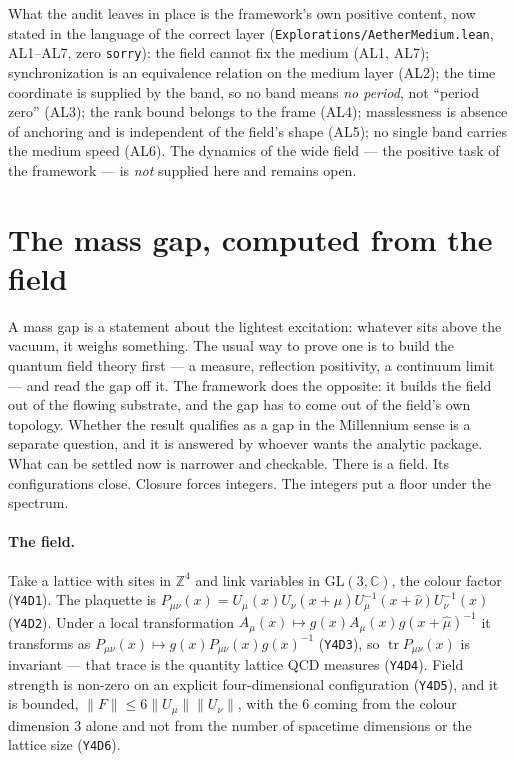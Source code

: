 \documentclass[aps,prd,preprint,superscriptaddress,amsmath,amssymb]{revtex4-2}
\begin{document}
What the audit leaves in place is the framework's own positive content, now
stated in the language of the correct layer (\texttt{Explorations/AetherMedium.lean}, AL1--AL7, zero \texttt{sorry}):
the field cannot fix the medium (AL1, AL7); synchronization is an equivalence
relation on the medium layer (AL2); the time coordinate is supplied by the band,
so no band means \emph{no period}, not ``period zero'' (AL3); the rank bound
belongs to the frame (AL4); masslessness is absence of anchoring and is
independent of the field's shape (AL5); no single band carries the medium speed
(AL6).  The dynamics of the wide field --- the positive task of the framework ---
is \emph{not} supplied here and remains open.

\section{The mass gap, computed from the field}
\label{sec:ymstatus}

A mass gap is a statement about the lightest excitation: whatever sits above
the vacuum, it weighs something.  The usual way to prove one is to build the
quantum field theory first --- a measure, reflection positivity, a continuum
limit --- and read the gap off it.  The framework does the opposite: it builds
the field out of the flowing substrate, and the gap has to come out of the
field's own topology.  Whether the result qualifies as a gap in the Millennium
sense is a separate question, and it is answered by whoever wants the analytic
package.  What can be settled now is narrower and checkable.  There is a field.
Its configurations close.  Closure forces integers.  The integers put a floor
under the spectrum.

\paragraph{The field.}
Take a lattice with sites in $\mathbb{Z}^4$ and link variables in
$\mathrm{GL}(3,\mathbb{C})$, the colour factor (\texttt{Y4D1}).  The plaquette
is $P_{\mu\nu}(x)=U_\mu(x)U_\nu(x+\hat\mu)U^{-1}_\mu(x+\hat\nu)U^{-1}_\nu(x)$
(\texttt{Y4D2}).  Under a local transformation
$A_\mu(x)\mapsto g(x)A_\mu(x)g(x+\hat\mu)^{-1}$ it transforms as
$P_{\mu\nu}(x)\mapsto g(x)P_{\mu\nu}(x)g(x)^{-1}$ (\texttt{Y4D3}), so
$\operatorname{tr}P_{\mu\nu}(x)$ is invariant --- that trace is the quantity
lattice QCD measures (\texttt{Y4D4}).  Field strength is non-zero on an
explicit four-dimensional configuration (\texttt{Y4D5}), and it is bounded,
$\|F\|\le 6\|U_\mu\|\|U_\nu\|$, with the $6$ coming from the colour dimension
$3$ alone and not from the number of spacetime dimensions or the lattice size
(\texttt{Y4D6}).
\end{document}
